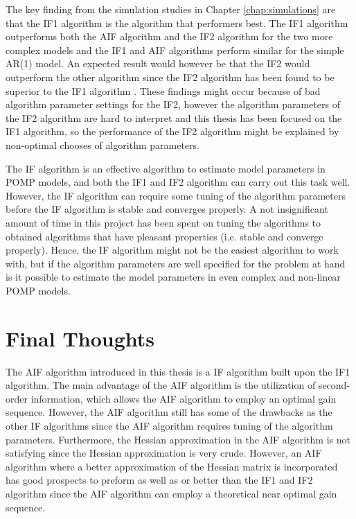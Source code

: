 \documentclass[twoside,openright]{report}
\begin{document}
The key finding from the simulation studies in Chapter \ref{chap:simulations} are that the IF1 algorithm is the algorithm that performers best. The IF1 algorithm outperforms both the AIF algorithm and the IF2 algorithm for the two more complex models and the IF1 and AIF algorithms perform similar for the simple AR(1) model. An expected result would however be that the IF2 would outperform the other algorithm since the IF2 algorithm has been found to be superior to the IF1 algorithm \cite{ionides2015inference}. These findings might occur because of bad algorithm parameter settings for the IF2, however the algorithm parameters of the IF2 algorithm are hard to interpret and this thesis has been focused on the IF1 algorithm, so the performance of the IF2 algorithm might be explained by non-optimal chooses of algorithm parameters. 

The IF algorithm is an effective algorithm to estimate model parameters in POMP models, and both the IF1 and IF2 algorithm can carry out this task well. However, the IF algorithm can require  some tuning of the algorithm parameters before the IF algorithm is stable and converges properly. A not insignificant amount of time in this project has been spent on tuning the algorithms to obtained algorithms that have pleasant properties (i.e. stable and converge properly). Hence, the IF algorithm might not be the easiest algorithm to work with, but if the algorithm parameters are well specified for the problem at hand is it possible to estimate the model parameters in even complex and non-linear POMP models.

\section{Final Thoughts}
The AIF algorithm introduced in this thesis is a IF algorithm built upon the IF1 algorithm. The main advantage of the AIF algorithm is the utilization of second-order information, which  allows the AIF algorithm to employ an optimal gain sequence. However, the AIF algorithm still has some of the drawbacks as the other IF algorithms since the AIF algorithm requires tuning of the algorithm parameters. Furthermore, the Hessian approximation in the AIF algorithm is not satisfying since the Hessian approximation is very crude.  However, an AIF algorithm where a better approximation of the Hessian matrix is incorporated has good prospects to preform as well as or better than the IF1 and IF2 algorithm since the AIF algorithm can employ a theoretical near optimal gain sequence. 



\end{document}

